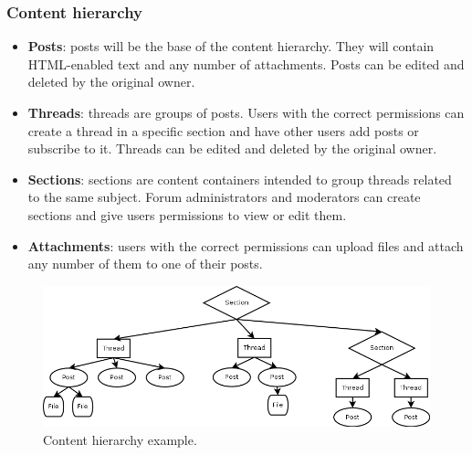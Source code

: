 \documentclass[12pt]{report}
\renewcommand\emph{\textbf}
\begin{document}
                     \subsubsection{Content hierarchy}
                        \begin{itemize}
                            \item \emph{Posts}: posts will be the base of the content hierarchy. They will contain HTML-enabled text and any number of attachments.
                            Posts can be edited and deleted by the original owner.
                            \item \emph{Threads}: threads are groups of posts. Users with the correct permissions can create a thread in a specific section and have other users add posts or subscribe to it.
                            Threads can be edited and deleted by the original owner.
                            \item \emph{Sections}: sections are content containers intended to group threads related to the same subject. Forum administrators and moderators can create sections and give users permissions to view or edit them.
                            \item \emph{Attachments}: users with the correct permissions can upload files and attach any number of them to one of their posts.
                        \end{itemize}

                        \begin{figure}[h]
                        \caption{Content hierarchy example.}
                        \centering
                        \includegraphics[width=1\textwidth]{ed/hier_sec}
                        \end{figure}
\end{document}
